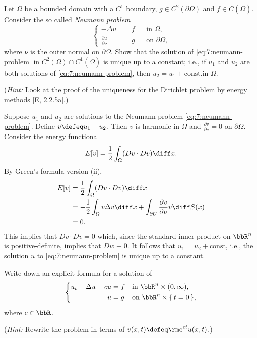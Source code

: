 \begin{problem}
  Let \(\Omega\) be a bounded domain with a \(C^1\) boundary, \(g\in
  C^2(\partial\Omega)\) and \(f\in C(\bar\Omega)\). Consider the so called
  \emph{Neumann problem}
  \[
    \label{eq:7:neumann-problem}%
    \tag{\(*\)}%
    \left\{
      \begin{aligned}
        -\Delta u&=f&&\text{in \(\Omega\),}\\
        \frac{\partial u}{\partial\nu}&=g&&\text{on \(\partial\Omega\),}
      \end{aligned}
    \right.
  \]
  where \(\nu\) is the outer normal on \(\partial\Omega\). Show that the
  solution of \eqref{eq:7:neumann-problem} in
  \(C^2(\Omega)\cap C^1(\bar\Omega)\) is unique up to a constant; i.e., if
  \(u_1\) and \(u_2\) are both solutions of \eqref{eq:7:neumann-problem},
  then \(u_2=u_1+\text{const.}\)\@ in \(\Omega\).

  \noindent (\emph{Hint:} Look at the proof of the uniqueness for the
  Dirichlet problem by energy methods [E, 2.2.5a].)
\end{problem}
\begin{solution}
  Suppose \(u_1\) and \(u_2\) are solutions to the Neumann problem
  \eqref{eq:7:neumann-problem}. Define \(v\defeq u_1-u_2\). Then \(v\) is
  harmonic in \(\Omega\) and \(\frac{\partial v}{\partial \nu}=0\) on
  \(\partial\Omega\). Consider the energy functional
  \[
    E[v]=\frac{1}{2}\int_\Omega(Dv\cdot Dv)\diff x.
  \]
  By Green's formula version (ii),
  \begin{align*}
    E[v]
    &=\frac{1}{2}\int_\Omega(Dv\cdot Dv)\diff x\\
    &=-\frac{1}{2}\int_\Omega v\Delta v\diff x
      +\int_{\partial U}\frac{\partial
      v}{\partial\nu} v\diff S(x)\\
    &=0.
  \end{align*}
  This implies that \(Dv\cdot Dv=0\) which, since the standard inner
  product on \(\bbR^n\) is positive-definite, implies that \(Dw\equiv
  0\). It follows that \(u_1=u_2+\text{const}\), i.e., the solution \(u\)
  to \eqref{eq:7:neumann-problem} is unique up to a constant.
\end{solution}
\newpage

\begin{problem}
  Write down an explicit formula for a solution of
  \[
    \left\{
      \begin{aligned}
        u_t-\Delta u+cu&=f&&\text{in \(\bbR^n\times(0,\infty)\),}\\
        u&=g&&\text{on \(\bbR^n\times\{\,t=0\,\}\),}
      \end{aligned}
    \right.
  \]
  where \(c\in\bbR\).

  \noindent (\emph{Hint:} Rewrite the problem in terms of
  \(v(x,t)\defeq\rme^{ct}u(x,t)\).)
\end{problem}
\begin{solution}
\end{solution}


